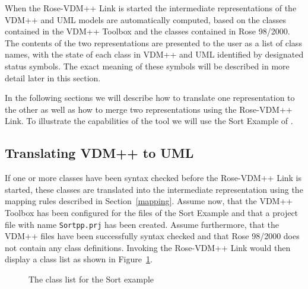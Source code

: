 \documentclass[\pformat,12pt]{article}
\newcommand{\vdmpp}{VDM++}
\newcommand{\link}{Rose-\vdmpp{} Link}
\newcommand{\rose}{Rose 98/2000}
\begin{document}



When the \link{} is started the intermediate representations of the
\vdmpp{} and UML models are automatically computed, based on the
classes contained in the \vdmpp{} Toolbox and the classes contained in
\rose{}. The contents of the two representations are presented to the
user as a list of class names, with the state of each class in
\vdmpp{} and UML identified by designated status symbols. The exact
meaning of these symbols will be described in more detail later in
this section.
   
In the following sections we will describe how to translate one representation to the other   
as well as how to merge two representations using the \link{}. To illustrate the   
capabilities of the tool we will use the Sort Example of \cite{UserManPP-SCSK}.  

\subsection{Translating VDM++ to UML}
\label{trans1}

If one or more classes have been syntax checked before the \link{} is
started, these classes are translated into the intermediate
representation using the mapping rules described in
Section~\ref{mapping}.  Assume now, that the \vdmpp{} Toolbox has been
configured for the files of the Sort Example and that a project file
with name {\tt Sortpp.prj} has been created. Assume furthermore, that
the \vdmpp{} files have been successfully syntax checked and that \rose{}
does not contain any class definitions. Invoking the \link{} would
then display a class list as shown in Figure~\ref{fig:VDMtoUML}.

\begin{figure}[htb]
\begin{center}
\mbox{}
\caption{The class list for the Sort example\label{fig:VDMtoUML}}
\end{center}
\end{figure}
\end{document}
